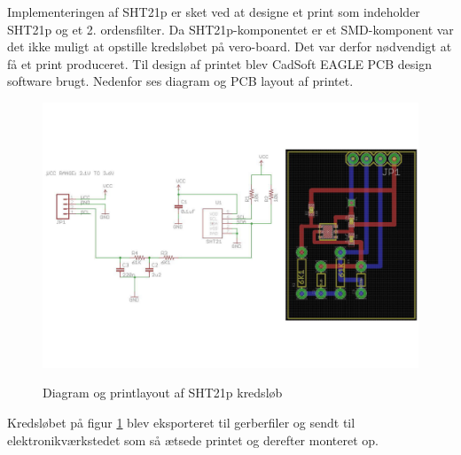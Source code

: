 Implementeringen af SHT21p er sket ved at designe et print som indeholder SHT21p og et 2. ordensfilter. 
Da SHT21p-komponentet er et SMD-komponent var det ikke muligt at opstille kredsløbet på vero-board. Det var derfor nødvendigt at få et print produceret. Til design af printet blev CadSoft EAGLE PCB design software brugt. Nedenfor ses diagram og PCB layout af printet.


\begin{figure}[htb]
\centering
{\includegraphics[width=\textwidth]{filer/implementering/SHT_pcb}}
\caption{Diagram og printlayout af SHT21p kredsl\o{}b}
\label{lab:SHT21p-kredsloeb}
\end{figure}

Kredsløbet på figur \ref{lab:SHT21p-kredsloeb} blev eksporteret til gerberfiler og sendt til elektronikværkstedet som så ætsede printet og derefter monteret op.

